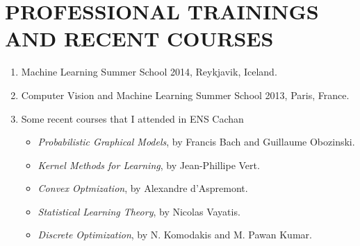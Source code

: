 \documentclass{res}
\begin{document}
\begin{resume}
\begin{enumerate}
        \end{enumerate}       



        \section{PROFESSIONAL TRAININGS AND RECENT COURSES}  
        \begin{enumerate}
        \item Machine Learning Summer School 2014, Reykjavik, Iceland.
        \item Computer Vision and Machine Learning Summer School 2013, Paris, France.
        \item Some recent courses that I attended in ENS Cachan
        \begin{itemize}
        \item \emph{Probabilistic Graphical Models}, by Francis Bach and Guillaume Obozinski.
        \item \emph{Kernel Methods for Learning}, by Jean-Phillipe Vert.
        \item \emph{Convex Optmization}, by Alexandre d'Aspremont.
        \item \emph{Statistical Learning Theory}, by Nicolas Vayatis. 
        \item \emph{Discrete Optimization}, by N. Komodakis and M. Pawan Kumar. 
        \end{itemize}
        \end{enumerate}        


\end{resume}
\end{document}
